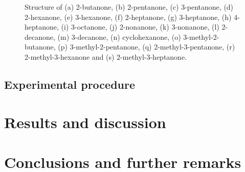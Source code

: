 \begin{figure}
\begin{subfloatrow}
\end{subfloatrow}
\bigskip
\begin{subfloatrow}
\quad
{}
\quad
{}
\end{subfloatrow}
\bigskip
\caption{Structure of (a) 2-butanone, (b) 2-pentanone, (c) 3-pentanone, (d) 2-hexanone, (e) 3-hexanone, (f) 2-heptanone, (g) 3-heptanone, (h) 4-heptanone, (i) 3-octanone,  (j) 2-nonanone, (k) 3-nonanone, (l) 2-decanone, (m) 3-decanone, (n) cyclohexanone, (o) 3-methyl-2-butanone, (p) 3-methyl-2-pentanone, (q) 2-methyl-3-pentanone, (r) 2-methyl-3-hexanone and (s) 2-methyl-3-heptanone.}
\label{fig:k}
\end{figure}


\subsection{Experimental procedure}






\section{Results and discussion}
\section{Conclusions and further remarks}



















